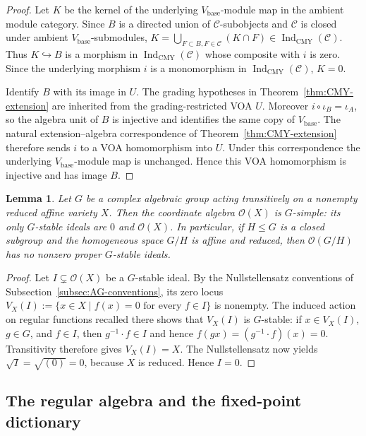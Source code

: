 \documentclass[10pt,a4paper]{amsart}
\numberwithin{equation}{section} \newtheorem{thm}{Theorem}[section] \newtheorem{lem}[thm]{Lemma} \newtheorem{ex}[thm]{Example} \newtheorem{prop}[thm]{Proposition} \newtheorem{cor}[thm]{Corollary} \newtheorem{defi}[thm]{Definition} \newtheorem{rmk}[thm]{Remark} \newtheorem{notation}[thm]{Notation}
\newcommand{\OO}{\mathcal O}
\newcommand{\IndCMY}{\operatorname{Ind}_{\mathrm{CMY}}}
\begin{document}
\begin{proof}
Let $K$ be the kernel of the underlying $V_{\mathrm{base}}$-module map in the ambient module category. Since $B$ is a directed union of $\mathcal C$-subobjects and $\mathcal C$ is closed under ambient $V_{\mathrm{base}}$-submodules, \(K=\bigcup_{F\subset B,F\in\mathcal C}(K\cap F)\in\IndCMY(\mathcal C)\). Thus $K\hookrightarrow B$ is a morphism in $\IndCMY(\mathcal C)$ whose composite with $i$ is zero. Since the underlying morphism $i$ is a monomorphism in $\IndCMY(\mathcal C)$, $K=0$.

Identify $B$ with its image in $U$. The grading hypotheses in Theorem~\ref{thm:CMY-extension} are inherited from the grading-restricted VOA $U$. Moreover $i\circ\iota_B=\iota_A$, so the algebra unit of $B$ is injective and identifies the same copy of $V_{\mathrm{base}}$. The natural extension--algebra correspondence of Theorem~\ref{thm:CMY-extension} therefore sends $i$ to a VOA homomorphism into $U$. Under this correspondence the underlying $V_{\mathrm{base}}$-module map is unchanged. Hence this VOA homomorphism is injective and has image $B$.
\end{proof}

\begin{lem}\label{lem:G-simple-homogeneous}
Let $G$ be a complex algebraic group acting transitively on a nonempty reduced affine variety $X$. Then the coordinate algebra $\OO(X)$ is $G$-simple: its only $G$-stable ideals are $0$ and $\OO(X)$. In particular, if $H\le G$ is a closed subgroup and the homogeneous space $G/H$ is affine and reduced, then $\OO(G/H)$ has no nonzero proper $G$-stable ideals.
\end{lem}

\begin{proof}
Let $I\subsetneq\OO(X)$ be a $G$-stable ideal. By the Nullstellensatz conventions of Subsection~\ref{subsec:AG-conventions}, its zero locus \(V_X(I):=\{x\in X\mid f(x)=0\text{ for every }f\in I\}\) is nonempty. The induced action on regular functions recalled there shows that $V_X(I)$ is $G$-stable: if $x\in V_X(I)$, $g\in G$, and $f\in I$, then $g^{-1}\cdot f\in I$ and hence \(f(gx)=(g^{-1}\cdot f)(x)=0\). Transitivity therefore gives $V_X(I)=X$. The Nullstellensatz now yields \(\sqrt I=\sqrt{(0)}=0\), because $X$ is reduced. Hence $I=0$.
\end{proof}

\subsection{The regular algebra and the fixed-point dictionary}
\end{document}
